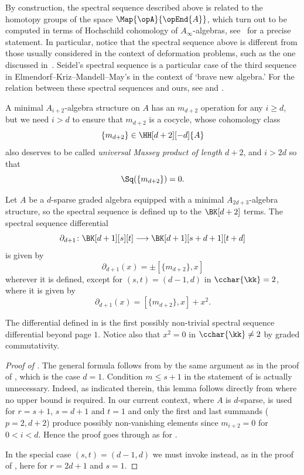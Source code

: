 \documentclass[a4paper]{amsart}
\begin{document}
\begin{remark}
  By construction, the spectral sequence described above is related to the
  homotopy groups of the space $\Map{\opA}{\opEnd{A}}$, which turn out to be computed in
  terms of Hochschild cohomology of $A_\infty$-algebras,
  see~\cite[Prop.~6.9]{Mur20b} for a precise statement. In particular, notice that the spectral sequence
  above is different from those usually considered in the context of deformation
  problems, such as the one discussed in~\cite[Ch.~3]{Sei15}. Seidel's spectral
  sequence is a particular case of the third sequence in
  Elmendorf--Kriz--Mandell--May's \cite[Thm.~1.6]{EKMM07} in the context of `brave new algebra.' For the relation between these spectral sequences and ours, see \cite[Sec.~2]{Ang11} and \cite[Sec.~7]{Mur20b}.
\end{remark}

A minimal $A_{i+2}$-algebra structure on $A$ has an $m_{d+2}$ operation for any $i\geq d$, but we need $i>d$ to ensure that $m_{d+2}$ is a cocycle, whose cohomology class
\[\{m_{d+2}\}\in\HH[d+2][-d]{A}\]
also deserves to be called \emph{universal Massey product of length $d+2$}, and $i>2d$ so that \[\Sq(\{m_{d+2}\})=0.\]

\begin{proposition}
  \label{prop:differential_d+1}
  Let $A$ be a $d$-sparse graded algebra equipped with a minimal $A_{2d+3}$-algebra structure, so the spectral sequence is defined up to the $\BK[d+2]$ terms. The spectral sequence differential \[\partial_{d+1}\colon \BK[d+1][s][t]\longrightarrow \BK[d+1][s+d+1][t+d]\]
  is given by 
  \[\partial_{d+1}(x)=\pm[\{m_{d+2}\},x]\]
  wherever it is defined, except for $(s,t)=(d-1,d)$ in $\cchar{\kk}=2$, where it is given by
  \[\partial_{d+1}(x)=[\{m_{d+2}\},x]+x^2.\]
\end{proposition}

\begin{remark}
  The differential defined in  is the first possibly
  non-trivial spectral sequence differential beyond page $1$. Notice also that $x^2=0$ in $\cchar{\kk}\neq 2$ by graded commutativity.
\end{remark}

\begin{proof}[Proof of ]
  The general formula follows from \cite[Lem.~6.1]{Mur20b} by the same argument as in the proof of \cite[Thm.~6.5]{Mur20b}, which is the case $d=1$. Condition $m\leq s+1$ in the statement of \cite[Lem.~6.1]{Mur20b} is actually unnecessary. Indeed, as indicated therein, this lemma follows directly from \cite[Prop.~3.5]{Mur20b} where no upper bound is required. In our current context, where $A$ is $d$-sparse, \cite[Prop.~3.5]{Mur20b} is used for $r=s+1$, $s=d+1$ and $t=1$ and only the first and last summands ($p=2,d+2$) produce possibly non-vanishing elements since $m_{i+2}=0$ for $0<i<d$. Hence the proof goes through as for \cite[Thm.~6.5]{Mur20b}.

  In the special case $(s,t)=(d-1,d)$ we must invoke \cite[Cors.~3.9,3.10]{Mur20b} instead, as in the proof of \cite[Thm.~6.5]{Mur20b}, here for $r=2d+1$ and $s=1$.
\end{proof}
\end{document}
